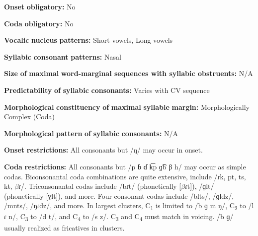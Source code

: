 \begin{styleBody}
\textbf{Onset} \textbf{obligatory:} No
\end{styleBody}

\begin{styleBody}
\textbf{Coda} \textbf{obligatory:} No
\end{styleBody}

\begin{styleBody}
\textbf{Vocalic} \textbf{nucleus} \textbf{patterns:} Short vowels, Long vowels
\end{styleBody}

\begin{styleBody}
\textbf{Syllabic} \textbf{consonant} \textbf{patterns:} Nasal
\end{styleBody}

\begin{styleBody}
\textbf{Size} \textbf{of} \textbf{maximal} \textbf{word{}-marginal sequences with syllabic obstruents:} N/A
\end{styleBody}

\begin{styleBody}
\textbf{Predictability} \textbf{of} \textbf{syllabic} \textbf{consonants:} Varies with CV sequence
\end{styleBody}

\begin{styleBody}
\textbf{Morphological} \textbf{constituency} \textbf{of} \textbf{maximal} \textbf{syllable} \textbf{margin:} Morphologically Complex (Coda)
\end{styleBody}

\begin{styleBody}
\textbf{Morphological} \textbf{pattern} \textbf{of} \textbf{syllabic} \textbf{consonants:} N/A
\end{styleBody}

\begin{styleBody}
\textbf{Onset} \textbf{restrictions:} All consonants but /ŋ/ may occur in onset.
\end{styleBody}

\begin{styleBody}
\textbf{Coda} \textbf{restrictions:} All consonants but /p ɓ ɗ k͡p ɡ͡b β h/ may occur as simple codas. Biconsonantal coda combinations are quite extensive, include /ɾk, pt, ts, kt, $\beta ɾ$/. Triconsonantal codas include /bɾt/ (phonetically [$\beta ɾ$t]), /ɡlt/ (phonetically [ɣlt]), and more. Four-consonant codas include /blts/, /ɡldz/, /mnts/, /ŋɾdz/, and more. In largest clusters, C\textsubscript{1} is limited to /b ɡ m ŋ/, C\textsubscript{2} to /l ɾ n/, C\textsubscript{3} to /d t/, and C\textsubscript{4} to /s z/. C\textsubscript{3} and C\textsubscript{4} must match in voicing. /b ɡ/ usually realized as fricatives in clusters.
\end{styleBody}

